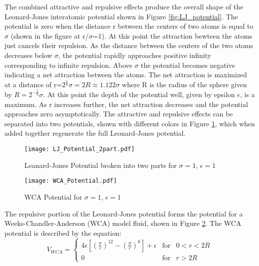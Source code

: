 \documentclass[12pt]{article}
\begin{document}
The combined attractive and repulsive effects produce the overall shape of the Leonard-Jones interatomic potential shown in Figure \ref{fig:LJ_potential}. The potential is zero when the distance r between the centers of two atoms is equal to $\sigma$ (shown in the figure at r/$\sigma$=1). At this point the attraction bewteen the atoms just cancels their repulsion. As the distance between the centers of the two atoms decreases below $\sigma$, the potential rapidly approaches positive infinity corresponding to infinite repulsion. Above $\sigma$ the potential becomes negative indicating a net attraction between the atoms. The net attraction is maximized at a distance of r=$2^\frac{1}{6}\sigma=2R\approx{1.122}\sigma$ where R is the radius of the sphere given by $R={2^{-\frac{5}{6}}}\sigma$. At this point the depth of the potential well, given by epsilon $\epsilon$, is a maximum. As r increases further, the net attraction decreases and the potential approaches zero asymptotically. The attractive and repulsive effects can be separated into two potentials, shown with different colors in Figure \ref{fig:LJ_potential_2parts}, which when added together regenerate the full Leonard-Jones potential. 

\begin{figure}[h!]
    \centering
    \texttt{[image: LJ\_Potential\_2part.pdf]}
    \caption{Leanard-Jones Potential broken into two parts for $\sigma=1$, $\epsilon=1$}
    \label{fig:LJ_potential_2parts}
  \end{figure}
 

\begin{figure}[h!]
    \centering
    \texttt{[image: WCA\_Potential.pdf]}
    \caption{WCA Potential for $\sigma=1$, $\epsilon=1$}
    \label{fig:WCA_potential}
  \end{figure}


The repulsive portion of the Leonard-Jones potential forms the potential for a Weeks-Chandler-Anderson (WCA) model fluid, shown in Figure \ref{fig:WCA_potential}. The WCA potential is described by the equation: \begin{equation}{V_{WCA}=\left\{\begin{array}{rcl} {4\epsilon{\left[\left(\frac{\sigma}{r}\right)^{12} - \left(\frac{\sigma}{r}\right)^6 \right]}+\epsilon} & \mbox{for} & 0<r<{2R} \\ 0 & \mbox{for} & r>2R \end{array}\right.}\end{equation} 
\end{document}
